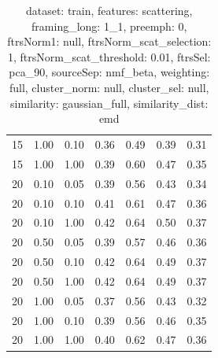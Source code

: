 \begin{table}
\begin{center}
\begin{tabular}{lllcccc}
15 & 1.00 & 0.10 & 0.36 & 0.49 & 0.39 & 0.31 \\ 
15 & 1.00 & 1.00 & 0.39 & 0.60 & 0.47 & 0.35 \\ 
20 & 0.10 & 0.05 & 0.39 & 0.56 & 0.43 & 0.34 \\ 
20 & 0.10 & 0.10 & 0.41 & 0.61 & 0.47 & 0.36 \\ 
20 & 0.10 & 1.00 & 0.42 & 0.64 & 0.50 & 0.37 \\ 
20 & 0.50 & 0.05 & 0.39 & 0.57 & 0.46 & 0.36 \\ 
20 & 0.50 & 0.10 & 0.42 & 0.64 & 0.49 & 0.37 \\ 
20 & 0.50 & 1.00 & 0.42 & 0.64 & 0.49 & 0.37 \\ 
20 & 1.00 & 0.05 & 0.37 & 0.56 & 0.43 & 0.32 \\ 
20 & 1.00 & 0.10 & 0.39 & 0.56 & 0.46 & 0.35 \\ 
20 & 1.00 & 1.00 & 0.40 & 0.62 & 0.47 & 0.36 \\ 
\end{tabular} 
\end{center} 
\caption{dataset: train, features: scattering, framing\_long: 1\_1, preemph: 0, ftrsNorm1: null, ftrsNorm\_scat\_selection: 1, ftrsNorm\_scat\_threshold: 0.01, ftrsSel: pca\_90, sourceSep: nmf\_beta, weighting: full, cluster\_norm: null, cluster\_sel: null, similarity: gaussian\_full, similarity\_dist: emd} 
\label{datasetrFeaturscFraminlong1_1Preemp0Ftrsnorm1nuFtrsnoscatselect1Ftrsnoscatthresh0.01Ftrsselpc90SourcesepnmbeWeightfuClustenormnuClusteselnuSimilagafuSimiladistem} 
\end{table} 
 
